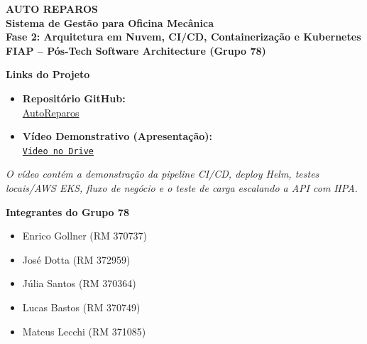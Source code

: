 \documentclass[10pt,a4paper]{article}
\begin{document}
\pagestyle{empty}

\begin{center}
    {\LARGE \textbf{\color{primary} AUTO REPAROS}} \\
    \vspace{0.1cm}
    {\large \textbf{Sistema de Gestão para Oficina Mecânica}} \\
    \vspace{0.15cm}
    {\color{gray}\textbf{Fase 2: Arquitetura em Nuvem, CI/CD, Containerização e Kubernetes}} \\
    \vspace{0.1cm}
    \textbf{FIAP -- Pós-Tech Software Architecture (Grupo 78)}
\end{center}

\vspace{0.2cm}

\begin{tcolorbox}[elegantbox]
    \begin{minipage}[t]{0.52\textwidth}
        \textbf{\color{primary} Links do Projeto}
        \vspace{0.2cm}
        \begin{itemize}
            \item \textbf{Repositório GitHub:} \\
            \href{https://github.com/Grupo78-PosTech-15SOAT/AutoReparos}{AutoReparos}
            
            \item \textbf{Vídeo Demonstrativo (Apresentação):} \\
            \href{https://drive.google.com/file/d/1wpeMYPY7q6-YYxHCgSaO52PLPLOrK1k3/view?usp=sharing}{\texttt{Video no Drive}}
        \end{itemize}
        \vspace{0.1cm}
        \textit{\small * O vídeo contém a demonstração da pipeline CI/CD, deploy Helm, testes locais/AWS EKS, fluxo de negócio e o teste de carga escalando a API com HPA.}
    \end{minipage}
    \hfill
    \begin{minipage}[t]{0.42\textwidth}
        \textbf{\color{primary} Integrantes do Grupo 78}
        \vspace{0.2cm}
        \begin{itemize}
            \item Enrico Gollner (RM 370737)
            \item José Dotta (RM 372959)
            \item Júlia Santos (RM 370364)
            \item Lucas Bastos (RM 370749)
            \item Mateus Lecchi (RM 371085)
        \end{itemize}
    \end{minipage}
\end{tcolorbox}
\end{document}
